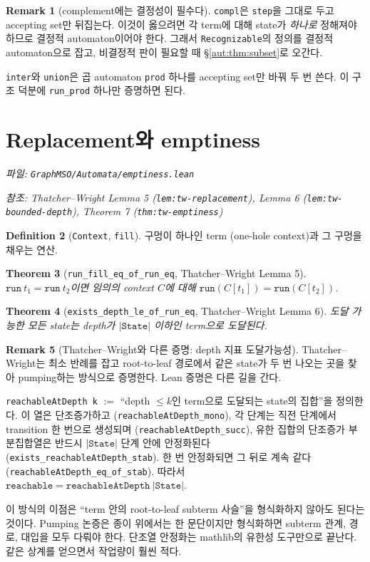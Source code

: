 \documentclass[11pt]{article}
\theoremstyle{definition}
\newtheorem{definition}{Definition}[section]
\newtheorem{remark}[definition]{Remark}
\theoremstyle{plain}
\newtheorem{theorem}[definition]{Theorem}
\newcommand{\lean}[1]{\texttt{#1}}
\newcommand{\leanfile}[1]{\texttt{#1}}
\newcommand{\TW}{Thatcher--Wright}
\begin{document}
\begin{remark}[complement에는 결정성이 필수다]
\lean{compl}은 \lean{step}을 그대로 두고 accepting set만 뒤집는다. 이것이
옳으려면 각 term에 대해 state가 \emph{하나로} 정해져야 하므로 결정적
automaton이어야 한다. 그래서 \lean{Recognizable}의 정의를 결정적 automaton으로
잡고, 비결정적 판이 필요할 때 \S\ref{aut:thm:subset}로 오간다.

\lean{inter}와 \lean{union}은 곱 automaton \lean{prod} 하나를 accepting set만
바꿔 두 번 쓴다. 이 구조 덕분에 \lean{run\_prod} 하나만 증명하면 된다.
\end{remark}

\section{Replacement와 emptiness}
\label{aut:sec:emptiness}

\emph{파일: \leanfile{GraphMSO/Automata/emptiness.lean}}

\emph{참조: \TW{} Lemma 5 (\lean{lem:tw-replacement}), Lemma 6
(\lean{lem:tw-bounded-depth}), Theorem 7 (\lean{thm:tw-emptiness})}

\begin{definition}[\lean{Context}, \lean{fill}]
\label{aut:def:context}
구멍이 하나인 term (one-hole context)과 그 구멍을 채우는 연산.
\end{definition}

\begin{theorem}[\lean{run\_fill\_eq\_of\_run\_eq}, \TW{} Lemma 5]
\label{aut:thm:replacement}
$\lean{run}\ t_1 = \lean{run}\ t_2$이면 임의의 context $C$에 대해
$\lean{run}(C[t_1]) = \lean{run}(C[t_2])$.
\end{theorem}

\begin{theorem}[\lean{exists\_depth\_le\_of\_run\_eq}, \TW{} Lemma 6]
\label{aut:thm:boundeddepth}
도달 가능한 모든 state는 depth가 $|\lean{State}|$ 이하인 term으로 도달된다.
\end{theorem}

\begin{remark}[\TW{}와 다른 증명: depth 지표 도달가능성]
\label{aut:rem:emptinessproof}
\TW{}는 최소 반례를 잡고 root-to-leaf 경로에서 같은 state가 두 번 나오는 곳을
찾아 pumping하는 방식으로 증명한다. Lean 증명은 다른 길을 간다.

\lean{reachableAtDepth k} $:=$ ``depth $\le k$인 term으로 도달되는 state의
집합''을 정의한다. 이 열은 단조증가하고 (\lean{reachableAtDepth\_mono}), 각
단계는 직전 단계에서 transition 한 번으로 생성되며
(\lean{reachableAtDepth\_succ}), 유한 집합의 단조증가 부분집합열은 반드시
$|\lean{State}|$ 단계 안에 안정화된다 (\lean{exists\_reachableAtDepth\_stab}).
한 번 안정화되면 그 뒤로 계속 같다 (\lean{reachableAtDepth\_eq\_of\_stab}).
따라서 $\lean{reachable} = \lean{reachableAtDepth}\ |\lean{State}|$.

이 방식의 이점은 ``term 안의 root-to-leaf subterm 사슬''을 형식화하지 않아도
된다는 것이다. Pumping 논증은 종이 위에서는 한 문단이지만 형식화하면
subterm 관계, 경로, 대입을 모두 다뤄야 한다. 단조열 안정화는 mathlib의
유한성 도구만으로 끝난다. 같은 상계를 얻으면서 작업량이 훨씬 적다.
\end{remark}
\end{document}
